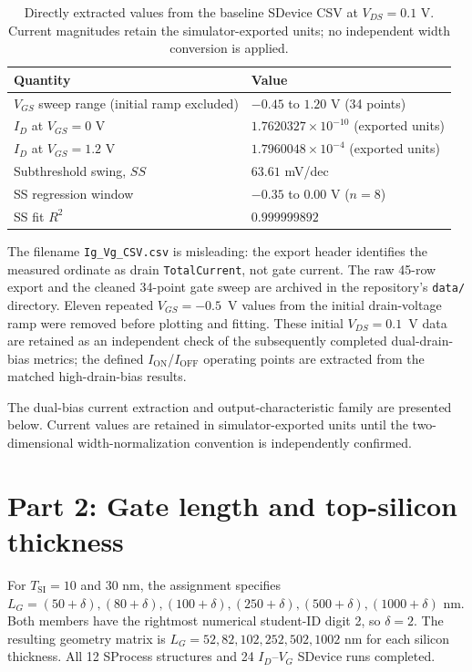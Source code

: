 \documentclass[11pt,a4paper]{article}
\begin{document}
\begin{table}[H]
\centering
\caption{Directly extracted values from the baseline SDevice CSV at $V_{DS}=0.1$ V. Current magnitudes retain the simulator-exported units; no independent width conversion is applied.}
\begin{tabular}{@{}ll@{}}
\toprule
Quantity & Value \\
\midrule
$V_{GS}$ sweep range (initial ramp excluded) & $-0.45$ to $1.20$ V (34 points) \\
$I_D$ at $V_{GS}=0$ V & $1.7620327\times10^{-10}$ (exported units) \\
$I_D$ at $V_{GS}=1.2$ V & $1.7960048\times10^{-4}$ (exported units) \\
Subthreshold swing, $SS$ & $63.61$ mV/dec \\
SS regression window & $-0.35$ to $0.00$ V ($n=8$) \\
SS fit $R^2$ & $0.999999892$ \\
\bottomrule
\end{tabular}
\end{table}
The filename \texttt{Ig\_Vg\_CSV.csv} is misleading: the export
header identifies the measured ordinate as drain
\texttt{TotalCurrent}, not gate current. The raw 45-row export and the cleaned 34-point gate sweep
are archived in the repository's \texttt{data/} directory.
Eleven repeated $V_{GS}=-0.5$~V values from the initial
drain-voltage ramp were removed before plotting and fitting.
These initial $V_{DS}=0.1$~V data are retained as an
independent check of the subsequently completed dual-drain-bias
metrics; the defined $I_{\mathrm{ON}}$/$I_{\mathrm{OFF}}$ operating
points are extracted from the matched high-drain-bias results.

The dual-bias current extraction and output-characteristic family are
presented below. Current values are retained in simulator-exported
units until the two-dimensional width-normalization convention
is independently confirmed.



\section{Part 2: Gate length and top-silicon thickness}
For $T_{\mathrm{SI}}=10$ and $30$ nm, the assignment specifies
$L_G=(50+\delta),(80+\delta),(100+\delta),(250+\delta),(500+\delta),(1000+\delta)$ nm.
Both members have the rightmost numerical student-ID digit 2,
so $\delta=2$. The resulting geometry matrix is
$L_G=52,82,102,252,502,1002$ nm for each silicon thickness.
All 12 SProcess structures and 24 $I_D$--$V_G$ SDevice runs completed.
\end{document}
